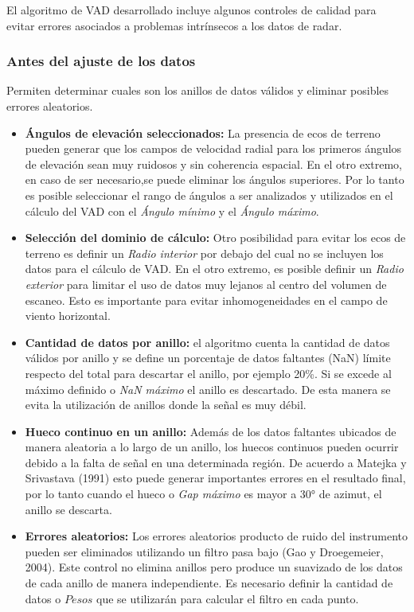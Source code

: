 \documentclass[12pt,spanish,oneside, a4paper]{book}
\providecommand{\tightlist}{%
  \setlength{\itemsep}{0pt}\setlength{\parskip}{0pt}}
\begin{document}
El algoritmo de VAD desarrollado incluye algunos controles de calidad
para evitar errores asociados a problemas intrínsecos a los datos de
radar.

\subsubsection{Antes del ajuste de los
datos}\label{antes-del-ajuste-de-los-datos}

Permiten determinar cuales son los anillos de datos válidos y eliminar
posibles errores aleatorios.

\begin{itemize}
\tightlist
\item
  \textbf{Ángulos de elevación seleccionados:} La presencia de ecos de
  terreno pueden generar que los campos de velocidad radial para los
  primeros ángulos de elevación sean muy ruidosos y sin coherencia
  espacial. En el otro extremo, en caso de ser necesario,se puede
  eliminar los ángulos superiores. Por lo tanto es posible seleccionar
  el rango de ángulos a ser analizados y utilizados en el cálculo del
  VAD con el \emph{Ángulo mínimo} y el \emph{Ángulo máximo}.
\item
  \textbf{Selección del dominio de cálculo:} Otro posibilidad para
  evitar los ecos de terreno es definir un \emph{Radio interior} por
  debajo del cual no se incluyen los datos para el cálculo de VAD. En el
  otro extremo, es posible definir un \emph{Radio exterior} para limitar
  el uso de datos muy lejanos al centro del volumen de escaneo. Esto es
  importante para evitar inhomogeneidades en el campo de viento
  horizontal.
\item
  \textbf{Cantidad de datos por anillo:} el algoritmo cuenta la cantidad
  de datos válidos por anillo y se define un porcentaje de datos
  faltantes (NaN) límite respecto del total para descartar el anillo,
  por ejemplo 20\%. Si se excede al máximo definido o \emph{NaN máximo}
  el anillo es descartado. De esta manera se evita la utilización de
  anillos donde la señal es muy débil.
\item
  \textbf{Hueco continuo en un anillo:} Además de los datos faltantes
  ubicados de manera aleatoria a lo largo de un anillo, los huecos
  continuos pueden ocurrir debido a la falta de señal en una determinada
  región. De acuerdo a Matejka y Srivastava (1991) esto puede generar
  importantes errores en el resultado final, por lo tanto cuando el
  hueco o \emph{Gap máximo} es mayor a 30° de azimut, el anillo se
  descarta.
\item
  \textbf{Errores aleatorios:} Los errores aleatorios producto de ruido
  del instrumento pueden ser eliminados utilizando un filtro pasa bajo
  (Gao y Droegemeier, 2004). Este control no elimina anillos pero
  produce un suavizado de los datos de cada anillo de manera
  independiente. Es necesario definir la cantidad de datos o \(Pesos\)
  que se utilizarán para calcular el filtro en cada punto.
\end{itemize}
\end{document}
